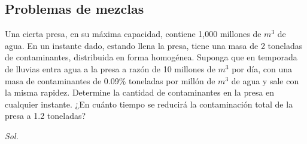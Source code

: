 \subsection{Problemas de mezclas}
\begin{example}
    Una cierta presa, en su máxima capacidad, contiene 1,000 millones de $m^3$ de agua. En un instante dado, estando llena la presa, tiene una masa de 2 toneladas de contaminantes, distribuida en forma homogénea. Suponga que en temporada de lluvias entra agua a la presa a razón de 10 millones de $m^3$ por día, con una masa de contaminantes de 0.09\% toneladas por millón de $m^3$ de agua y sale con la misma rapidez. Determine la cantidad de contaminantes en la presa en cualquier instante. ¿En cuánto tiempo se reducirá la contaminación total de la presa a 1.2 toneladas?
\end{example}

\textit{ Sol. }

